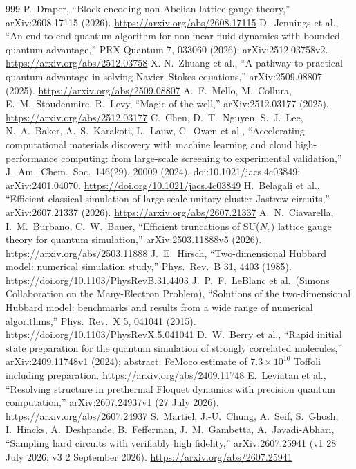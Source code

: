 \begin{thebibliography}{999}
 P.~Draper, ``Block encoding non-Abelian lattice gauge theory,'' arXiv:2608.17115 (2026). \url{https://arxiv.org/abs/2608.17115}
 D.~Jennings et al., ``An end-to-end quantum algorithm for nonlinear fluid dynamics with bounded quantum advantage,'' PRX Quantum 7, 033060 (2026); arXiv:2512.03758v2. \url{https://arxiv.org/abs/2512.03758}
 X.-N.~Zhuang et al., ``A pathway to practical quantum advantage in solving Navier--Stokes equations,'' arXiv:2509.08807 (2025). \url{https://arxiv.org/abs/2509.08807}
 A.~F.~Mello, M.~Collura, E.~M.~Stoudenmire, R.~Levy, ``Magic of the well,'' arXiv:2512.03177 (2025). \url{https://arxiv.org/abs/2512.03177}
 C.~Chen, D.~T.~Nguyen, S.~J.~Lee, N.~A.~Baker, A.~S.~Karakoti, L.~Lauw, C.~Owen et al., ``Accelerating computational materials discovery with machine learning and cloud high-performance computing: from large-scale screening to experimental validation,'' J.\ Am.\ Chem.\ Soc.\ 146(29), 20009 (2024), doi:10.1021/jacs.4c03849; arXiv:2401.04070. \url{https://doi.org/10.1021/jacs.4c03849}
 H.~Belagali et al., ``Efficient classical simulation of large-scale unitary cluster Jastrow circuits,'' arXiv:2607.21337 (2026). \url{https://arxiv.org/abs/2607.21337}
 A.~N.~Ciavarella, I.~M.~Burbano, C.~W.~Bauer, ``Efficient truncations of SU($N_c$) lattice gauge theory for quantum simulation,'' arXiv:2503.11888v5 (2026). \url{https://arxiv.org/abs/2503.11888}
 J.~E.~Hirsch, ``Two-dimensional Hubbard model: numerical simulation study,'' Phys.\ Rev.\ B 31, 4403 (1985). \url{https://doi.org/10.1103/PhysRevB.31.4403}
 J.~P.~F.~LeBlanc et al.\ (Simons Collaboration on the Many-Electron Problem), ``Solutions of the two-dimensional Hubbard model: benchmarks and results from a wide range of numerical algorithms,'' Phys.\ Rev.\ X 5, 041041 (2015). \url{https://doi.org/10.1103/PhysRevX.5.041041}
 D.~W.~Berry et al., ``Rapid initial state preparation for the quantum simulation of strongly correlated molecules,'' arXiv:2409.11748v1 (2024); abstract: FeMoco estimate of $7.3\times10^{10}$ Toffoli including preparation. \url{https://arxiv.org/abs/2409.11748}
 E.~Leviatan et al., ``Resolving structure in prethermal Floquet dynamics with precision quantum computation,'' arXiv:2607.24937v1 (27 July 2026). \url{https://arxiv.org/abs/2607.24937}
 S.~Martiel, J.-U.~Chung, A.~Seif, S.~Ghosh, I.~Hincks, A.~Deshpande, B.~Fefferman, J.~M.~Gambetta, A.~Javadi-Abhari, ``Sampling hard circuits with verifiably high fidelity,'' arXiv:2607.25941 (v1 28 July 2026; v3 2 September 2026). \url{https://arxiv.org/abs/2607.25941}

\end{thebibliography}
